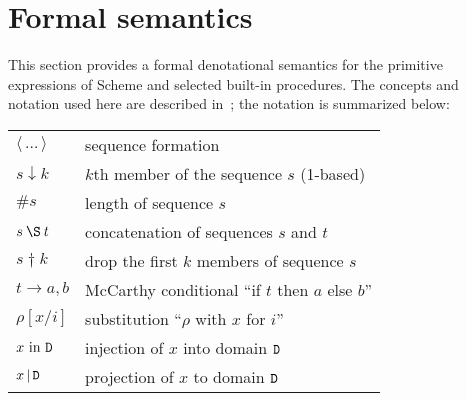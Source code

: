\section{Formal semantics}
\label{formalsemanticssection}

\bgroup

\newcommand{\sembrack}[1]{[\![#1]\!]}
\newcommand{\fun}[1]{\hbox{\it #1}}
\newenvironment{semfun}{\begin{tabbing}$}{$\end{tabbing}}
\newcommand\LOC{{\tt{}L}}
\newcommand\NAT{{\tt{}N}}
\newcommand\TRU{{\tt{}T}}
\newcommand\SYM{{\tt{}Q}}
\newcommand\CHR{{\tt{}H}}
\newcommand\NUM{{\tt{}R}}
\newcommand\FUN{{\tt{}F}}
\newcommand\EXP{{\tt{}E}}
\newcommand\STV{{\tt{}E}}
\newcommand\STO{{\tt{}S}}
\newcommand\ENV{{\tt{}U}}
\newcommand\ANS{{\tt{}A}}
\newcommand\ERR{{\tt{}X}}
\newcommand\EC{{\tt{}K}}
\newcommand\CC{{\tt{}C}}
\newcommand\MSC{{\tt{}M}}
\newcommand\PAI{\hbox{\EXP$_{\rm p}$}}
\newcommand\VEC{\hbox{\EXP$_{\rm v}$}}
\newcommand\STR{\hbox{\EXP$_{\rm s}$}}

\newcommand\elt{\downarrow}
\newcommand\drop{\dagger}

This section provides a formal denotational semantics for the primitive
expressions of Scheme and selected built-in procedures.  The concepts
and notation used here are described in~\cite{Stoy77}; the notation is
summarized below:

\begin{tabular}{ll}
$\langle\,\ldots\,\rangle$ & sequence formation \\
$s \elt k$	           & $k$th member of the sequence $s$ (1-based) \\
$\#s$			   & length of sequence $s$ \\
$s \:\S\: t$	           & concatenation of sequences $s$ and $t$ \\
$s \drop k$                & drop the first $k$ members of sequence $s$ \\
$t \rightarrow a, b$       & McCarthy conditional ``if $t$ then $a$ else $b$'' \\
$\rho[x/i]$	           & substitution ``$\rho$ with $x$ for $i$'' \\
$x\hbox{ \rm in }{\tt{}D}$         & injection of $x$ into domain ${\tt{}D}$ \\
$x\,\vert\,{\tt{}D}$	   & projection of $x$ to domain ${\tt{}D}$
\end{tabular}

